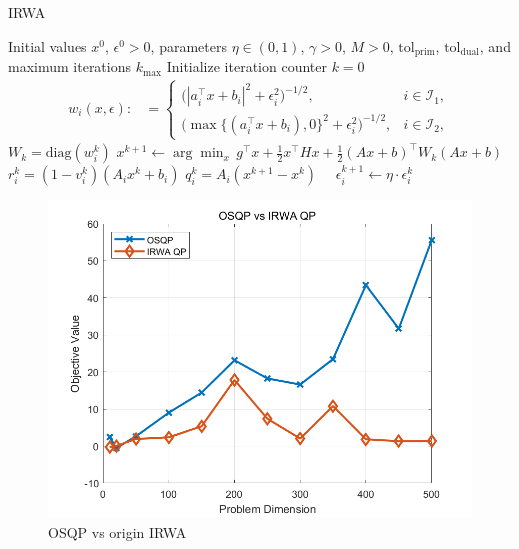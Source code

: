 \documentclass{article}
\begin{document}
\begin{algorithm}[H]
\caption{IRWA}
\label{alg:IRWA}
\begin{algorithmic}[1]
\Require Initial values $x^0$, $\epsilon^0 > 0$, parameters $\eta \in (0, 1)$, $\gamma > 0$, $M > 0$, $\text{tol}_{\text{prim}}$, $\text{tol}_{\text{dual}}$, and maximum iterations $k_{\text{max}}$
\State Initialize iteration counter $k = 0$
\Repeat
    \State 
    \begin{align}\label{ori-w-update}
    w_i(x, \epsilon) :&=
    \begin{cases}
    \big(|a_i^\top x + b_i|^2 + \epsilon_i^2\big)^{-1/2}, & i \in \mathcal{I}_1, \\
    \big(\max\{(a_i^\top x + b_i), 0\}^2 + \epsilon_i^2\big)^{-1/2}, & i \in \mathcal{I}_2,
    \end{cases}
    \end{align}
    \State $W_k = \text{diag}(w_i^k)$
    \State $x^{k+1} \gets \arg\min_x \, g^\top x + \frac{1}{2} x^\top H x + \frac{1}{2} (A x + b)^\top W_k (A x + b)$
    \State 
    $r_i^k = (1 - v_i^k)(A_i x^k + b_i)$
    \State
    $ q_i^k = A_i (x^{k+1} - x^k)$
    \State $\quad \epsilon_i^{k+1} \gets \eta \cdot \epsilon_i^k$
    \EndIf
\end{algorithmic}
\end{algorithm}

\begin{figure}[H]
    \centering
    \includegraphics[width=0.75\linewidth]{fig/OSQP_vs_origin.png}
    \caption{OSQP vs origin IRWA}
    \label{fig:enter-label}
\end{figure}
\end{document}
